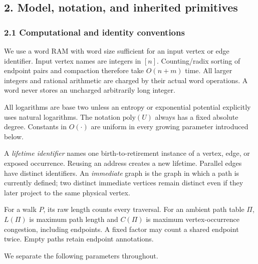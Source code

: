 \hypertarget{af-46593eb93e-model-notation-and-inherited-primitives}{%
\subsection{2. Model, notation, and inherited primitives}\label{af-46593eb93e-model-notation-and-inherited-primitives}}

\hypertarget{af-46593eb93e-computational-and-identity-conventions}{%
\subsubsection{2.1 Computational and identity conventions}\label{af-46593eb93e-computational-and-identity-conventions}}

We use a word RAM with word size sufficient for an input vertex or edge identifier. Input vertex names are integers in \([n]\). Counting/radix sorting of endpoint pairs and compaction therefore take \(O(n+m)\) time. All larger integers and rational arithmetic are charged by their actual word operations. A word never stores an uncharged arbitrarily long integer.

All logarithms are base two unless an entropy or exponential potential explicitly uses natural logarithms. The notation \(\mathrm{poly}(U)\) always has a fixed absolute degree. Constants in \(O(\cdot)\) are uniform in every growing parameter introduced below.

A \emph{lifetime identifier} names one birth-to-retirement instance of a vertex, edge, or exposed occurrence. Reusing an address creates a new lifetime. Parallel edges have distinct identifiers. An \emph{immediate} graph is the graph in which a path is currently defined; two distinct immediate vertices remain distinct even if they later project to the same physical vertex.

For a walk \(P\), its raw length counts every traversal. For an ambient path table \(\Pi\), \(L(\Pi)\) is maximum path length and \(C(\Pi)\) is maximum vertex-occurrence congestion, including endpoints. A fixed factor may count a shared endpoint twice. Empty paths retain endpoint annotations.

We separate the following parameters throughout.

